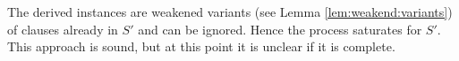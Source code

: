 The derived instances are weakened variants (see Lemma \vref{lem:weakend:variants}) of clauses already in \( S ' \) and can be ignored. Hence the process saturates for \( S' \). This approach is sound, but at this point it is unclear if it is complete.


%




